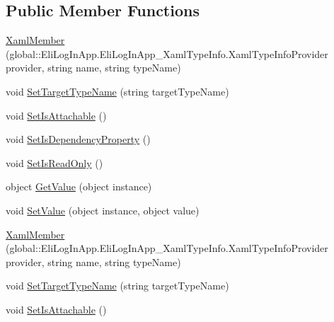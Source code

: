 \subsection*{Public Member Functions}
\begin{DoxyCompactItemize}
\item 
\hyperlink{class_eli_log_in_app_1_1_eli_log_in_app___xaml_type_info_1_1_xaml_member_a8abdb999c007e272946172e1027e0a57}{Xaml\+Member} (global\+::\+Eli\+Log\+In\+App.\+Eli\+Log\+In\+App\+\_\+\+Xaml\+Type\+Info.\+Xaml\+Type\+Info\+Provider provider, string name, string type\+Name)
\item 
void \hyperlink{class_eli_log_in_app_1_1_eli_log_in_app___xaml_type_info_1_1_xaml_member_a6d5d8f0c1ce0db9c720c9ad536569d21}{Set\+Target\+Type\+Name} (string target\+Type\+Name)
\item 
void \hyperlink{class_eli_log_in_app_1_1_eli_log_in_app___xaml_type_info_1_1_xaml_member_a8b4716c7c6399dcd07c3171a25801c5a}{Set\+Is\+Attachable} ()
\item 
void \hyperlink{class_eli_log_in_app_1_1_eli_log_in_app___xaml_type_info_1_1_xaml_member_ac40782344478059194f10f11f88c3fbe}{Set\+Is\+Dependency\+Property} ()
\item 
void \hyperlink{class_eli_log_in_app_1_1_eli_log_in_app___xaml_type_info_1_1_xaml_member_a5f2fce3ca44cf6a8033fdc8bea90b840}{Set\+Is\+Read\+Only} ()
\item 
object \hyperlink{class_eli_log_in_app_1_1_eli_log_in_app___xaml_type_info_1_1_xaml_member_ac213f6e122460781e69a532b26747ab7}{Get\+Value} (object instance)
\item 
void \hyperlink{class_eli_log_in_app_1_1_eli_log_in_app___xaml_type_info_1_1_xaml_member_afcaffc2f62e57fae06da1614f5e13a3c}{Set\+Value} (object instance, object value)
\item 
\hyperlink{class_eli_log_in_app_1_1_eli_log_in_app___xaml_type_info_1_1_xaml_member_a8abdb999c007e272946172e1027e0a57}{Xaml\+Member} (global\+::\+Eli\+Log\+In\+App.\+Eli\+Log\+In\+App\+\_\+\+Xaml\+Type\+Info.\+Xaml\+Type\+Info\+Provider provider, string name, string type\+Name)
\item 
void \hyperlink{class_eli_log_in_app_1_1_eli_log_in_app___xaml_type_info_1_1_xaml_member_a6d5d8f0c1ce0db9c720c9ad536569d21}{Set\+Target\+Type\+Name} (string target\+Type\+Name)
\item 
void \hyperlink{class_eli_log_in_app_1_1_eli_log_in_app___xaml_type_info_1_1_xaml_member_a8b4716c7c6399dcd07c3171a25801c5a}{Set\+Is\+Attachable} ()
\item 

\end{DoxyCompactItemize}
